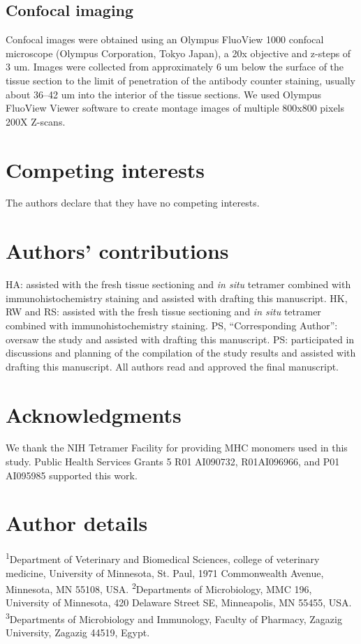 \documentclass{article}
\begin{document}
\subsection*{Confocal imaging}

Confocal images were obtained using an Olympus FluoView 1000 confocal microscope (Olympus Corporation, Tokyo Japan), a 20x objective and z-steps of 3 um. Images were collected from approximately 6 um below the surface of the tissue section to the limit of penetration of the antibody counter staining, usually about 36–42 um into the interior of the tissue sections. We used Olympus FluoView Viewer software to create montage images of multiple 800x800 pixels 200X Z-scans.

\section*{Competing interests}

The authors declare that they have no competing interests.

\section*{Authors’ contributions}

HA: assisted with the fresh tissue sectioning and \textit{in situ} tetramer combined with immunohistochemistry staining and assisted with drafting this manuscript. HK, RW and RS: assisted with the fresh tissue sectioning and \textit{in situ} tetramer combined with immunohistochemistry staining. PS, “Corresponding Author”: oversaw the study and assisted with drafting this manuscript. PS: participated in discussions and planning of the compilation of the study results and assisted with drafting this manuscript. All authors read and approved the final manuscript.

\section*{Acknowledgments}

We thank the NIH Tetramer Facility for providing MHC monomers used in this study. Public Health Services Grants 5 R01 AI090732, R01AI096966, and P01 AI095985 supported this work.

\section*{Author details}

\textsuperscript{1}Department of Veterinary and Biomedical Sciences, college of veterinary medicine, University of Minnesota, St. Paul, 1971 Commonwealth Avenue, Minnesota, MN 55108, USA. \textsuperscript{2}Departments of Microbiology, MMC 196, University of Minnesota, 420 Delaware Street SE, Minneapolis, MN 55455, USA. \textsuperscript{3}Departments of Microbiology and Immunology, Faculty of Pharmacy, Zagazig University, Zagazig 44519, Egypt.
\end{document}

